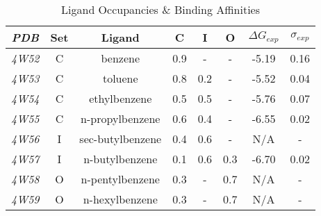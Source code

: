 \documentclass[T4paper.tex]{subfiles}
\begin{document}
\begin{table}[!htb]
\centering
\caption{Ligand Occupancies \& Binding Affinities \cite{Merski2015,T4affinity}}
\label{tbl:expdata}
\begin{tabular}{|c|c|c|c|c|c|c|c|}
\hline
\textit{\textbf{PDB}} &  \textbf{Set}  & \textbf{Ligand} & \textbf{C} & \textbf{I} & \textbf{O} & \boldmath$\Delta G_{exp}$  & \boldmath$\sigma_{exp}$  \\ \hline
\textit{4W52}   & \cellcolor[HTML]{800080} C   &  benzene          & \cellcolor[HTML]{C0C0C0}0.9    & -     & -    & -5.19      & 0.16          \\ \hline
\textit{4W53}   & \cellcolor[HTML]{800080} C   &  toluene          & \cellcolor[HTML]{C0C0C0}0.8    & 0.2   & -    & -5.52      & 0.04          \\ \hline
\textit{4W54}   & \cellcolor[HTML]{800080} C   &  ethylbenzene     & \cellcolor[HTML]{C0C0C0}0.5    & 0.5   & -    & -5.76      & 0.07          \\ \hline
\textit{4W55}   & \cellcolor[HTML]{800080} C   &  n-propylbenzene  & \cellcolor[HTML]{C0C0C0}0.6    & 0.4   & -    & -6.55      & 0.02          \\ \hline
\textit{4W56}   & \cellcolor[HTML]{00FFFF} I   &  sec-butylbenzene & 0.4        & \cellcolor[HTML]{C0C0C0}0.6      & -    & N/A      & -         \\ \hline
\textit{4W57}   & \cellcolor[HTML]{00FFFF} I   &  n-butylbenzene   & 0.1        & \cellcolor[HTML]{C0C0C0}0.6      & 0.3   & -6.70   & 0.02       \\ \hline
\textit{4W58}   & \cellcolor[HTML]{008000} O   &  n-pentylbenzene  & 0.3        &  -       & \cellcolor[HTML]{C0C0C0}0.7  & N/A     & -          \\ \hline
\textit{4W59}   & \cellcolor[HTML]{008000} O   &  n-hexylbenzene   & 0.3        &  -       & \cellcolor[HTML]{C0C0C0}0.7  & N/A     & -     \\ \hline
\end{tabular}
\end{table}
\end{document}
